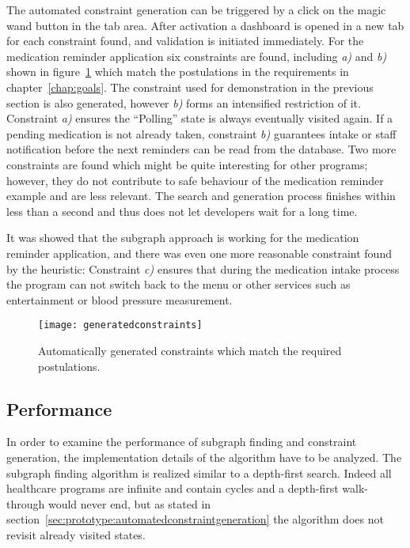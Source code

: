 The automated constraint generation can be triggered by a click on the magic wand button in the tab area. After activation a dashboard is opened in a new tab for each constraint found, and validation is initiated immediately. For the medication reminder application six constraints are found, including \emph{a)} and \emph{b)} shown in figure~\ref{fig:generatedconstraints} which match the postulations in the requirements in chapter~\ref{chap:goals}.
The constraint used for demonstration in the previous section is also generated, however \emph{b)} forms an intensified restriction of it.
Constraint \emph{a)} ensures the ``Polling'' state is always eventually visited again. If a pending medication is not already taken, constraint \emph{b)} guarantees intake or staff notification before the next reminders can be read from the database.
Two more constraints are found which might be quite interesting for other programs; however, they do not contribute to safe behaviour of the medication reminder example and are less relevant.
The search and generation process finishes within less than a second and thus does not let developers wait for a long time.

It was showed that the subgraph approach is working for the medication reminder application, and there was even one more reasonable constraint found by the heuristic: Constraint \emph{c)} ensures that during the medication intake process the program can not switch back to the menu or other services such as entertainment or blood pressure measurement.



\begin{figure}[htbp]
  \centering
  \texttt{[image: generatedconstraints]}
  \caption{Automatically generated constraints which match the required pos\-tu\-la\-tions.}
  \label{fig:generatedconstraints}
\end{figure}






\subsection{Performance}
\label{sec:performance}

In order to examine the performance of subgraph finding and constraint generation, the implementation details of the algorithm have to be analyzed. The subgraph finding algorithm is realized similar to a depth-first search. Indeed all healthcare programs are infinite and contain cycles and a depth-first walk-through would never end, but as stated in section~\ref{sec:prototype:automatedconstraintgeneration} the algorithm does not revisit already visited states.

